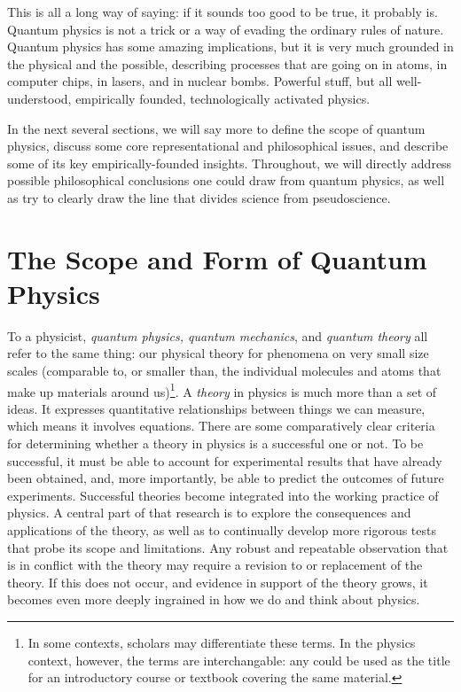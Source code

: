 \documentclass[12pt,onecolumn,preprintnumbers,amsmath,amssymbn,reprint,nofootinbib,superscriptaddress]{revtex4}    %
\begin{document}
This is all a long way of saying:  if it sounds too good to be true, it probably is. Quantum physics is not a trick or a way of evading the ordinary rules of nature.  Quantum physics has some amazing implications, but it is very much grounded in the physical and the possible, describing processes that are going on in atoms, in computer chips, in lasers, and in nuclear bombs.  Powerful stuff, but all well-understood, empirically founded, technologically activated physics. 

In the next several sections, we will say more to define the scope of quantum physics, discuss some core representational and philosophical issues, and describe some of its key empirically-founded insights.  Throughout, we will directly address possible philosophical conclusions one could draw from quantum physics, as well as try to clearly draw the line that divides science from pseudoscience.  


\section{The Scope and Form of Quantum Physics}

To a physicist, {\em quantum physics, quantum mechanics}, and {\em quantum theory} all refer to the same thing:  our physical theory for phenomena on very small size scales (comparable to, or smaller than, the individual molecules and atoms that make up materials around us)\footnote{In some contexts, scholars may differentiate these terms.  In the physics context, however, the terms are interchangable: any could be used as the title for an introductory course or textbook covering the same material.}.  A {\em theory} in physics is much more than a set of ideas.  It expresses quantitative relationships between things we can measure, which means it involves equations. There are some comparatively clear criteria for determining whether a theory in physics is a successful one or not.  To be successful, it must be able to account for experimental results that have already been obtained, and, more importantly, be able to predict the outcomes of future experiments. Successful theories become integrated into the working practice of physics. A central part of that research is to explore the consequences and applications of the theory, as well as to continually develop more rigorous tests that probe its scope and limitations.  Any robust and repeatable observation that is in conflict with the theory may require a revision to or replacement of the theory. If this does not occur, and evidence in support of the theory grows, it becomes even more deeply ingrained in how we do and think about physics.
\end{document}
